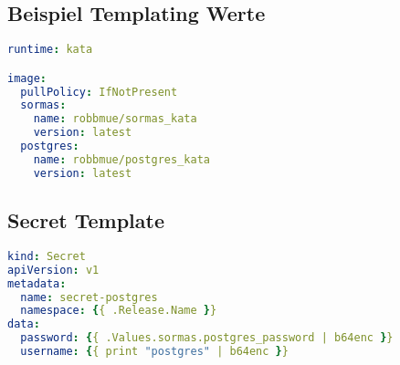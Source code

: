 \subsection{Beispiel Templating Werte}
\label{app:values_yaml}
\begin{lstlisting}[language=yaml, caption={templationg example}]
runtime: kata

image:
  pullPolicy: IfNotPresent
  sormas: 
    name: robbmue/sormas_kata
    version: latest
  postgres:
    name: robbmue/postgres_kata
    version: latest
\end{lstlisting}

\subsection{Secret Template}
\label{app:secret_template}
\begin{lstlisting}[language=yaml, caption={secret manifest}]
kind: Secret
apiVersion: v1
metadata: 
  name: secret-postgres
  namespace: {{ .Release.Name }}
data: 
  password: {{ .Values.sormas.postgres_password | b64enc }}
  username: {{ print "postgres" | b64enc }}
\end{lstlisting}

